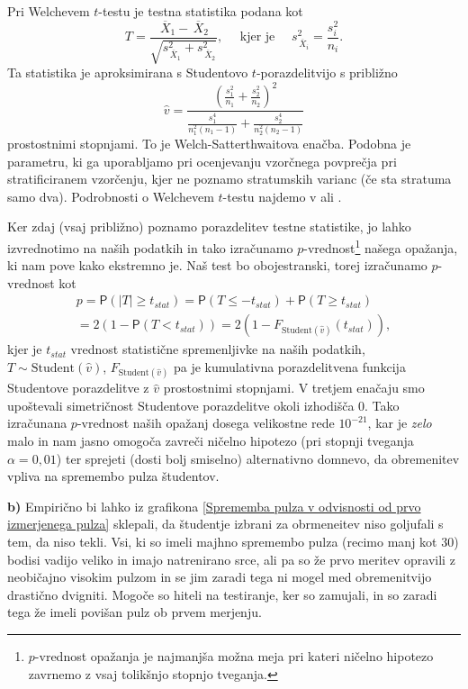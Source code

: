 \documentclass[a4paper,11pt]{article}
\newcommand{\olsi}[1]{\,\overline{\!{#1}}} %
\newcommand{\prob}{\mathsf{P}}
\begin{document}
Pri Welchevem $t$-testu je testna statistika podana kot
\[
    T = \frac{\olsi{X}_1 - \olsi{X}_2}{\sqrt{s_{\olsi{X}_1}^2 + s_{\olsi{X}_2}^2}},
    \quad \text{ kjer je }\quad s^2_{\olsi{X}_i} = \frac{s^2_i}{n_i}.
\]
Ta statistika je aproksimirana s Studentovo $t$-porazdelitvijo s približno 
\[
\hat{v} = \frac{\left(\frac{s_1^2}{n_1} + \frac{s_2^2}{n_2}\right)^2}{\frac{s_1^4}{n_1^2(n_1 - 1)} + \frac{s_2^4}{n_2^2(n_2 - 1)}} 
\]
prostostnimi stopnjami. To je Welch-Satterthwaitova enačba. Podobna je parametru, ki ga uporabljamo pri ocenjevanju vzorčnega povprečja pri stratificiranem vzorčenju, kjer ne poznamo stratumskih varianc (če sta stratuma samo dva). Podrobnosti o Welchevem $t$-testu najdemo v \cite{Welch} ali \cite[\S11]{Rice}.

Ker zdaj (vsaj približno) poznamo porazdelitev testne statistike, jo lahko izvrednotimo na naših podatkih in tako izračunamo $p$-vrednost\footnote{$p$-vrednost opažanja je najmanjša možna meja pri kateri ničelno hipotezo zavrnemo z vsaj tolikšnjo stopnjo tveganja.} našega opažanja, ki nam pove kako ekstremno je. Naš test bo obojestranski, torej izračunamo $p$-vrednost kot
\begin{multline*}
    p = \prob(\lvert T \rvert \geq t_{stat}) = 
    \prob(T \leq -t_{stat}) + \prob(T \geq t_{stat}) \\ = 
    2(1 - \prob(T < t_{stat})) = 
    2(1 - F_{\text{Student}(\hat{v})}(t_{stat})), 
\end{multline*}
kjer je $t_{stat}$ vrednost statistične spremenljivke na naših podatkih, $T \sim \text{Student}(\hat{v})$, $F_{\text{Student}(\hat{v})}$ pa je kumulativna porazdelitvena funkcija Studentove porazdelitve z $\hat v$ prostostnimi stopnjami. V tretjem enačaju smo upoštevali simetričnost Studentove porazdelitve okoli izhodišča $0$. Tako izračunana $p$-vrednost naših opažanj dosega velikostne rede $10^{-21}$, kar je \emph{zelo} malo in nam jasno omogoča zavreči ničelno hipotezo (pri stopnji tveganja $\alpha = 0,01$) ter sprejeti (dosti bolj smiselno) alternativno domnevo, da obremenitev vpliva na spremembo pulza študentov. 
\newline

\noindent
\textbf{b)} Empirično bi lahko  iz grafikona \ref{Sprememba pulza v odvisnosti od prvo izmerjenega pulza} sklepali, da študentje izbrani za obrmeneitev niso goljufali s tem, da niso tekli. Vsi, ki so imeli majhno spremembo pulza (recimo manj kot 30) bodisi vadijo veliko in imajo natrenirano srce, ali pa so že prvo meritev opravili z neobičajno visokim pulzom in se jim zaradi tega ni mogel med obremenitvijo drastično dvigniti. Mogoče so hiteli na testiranje, ker so zamujali, in so zaradi tega že imeli povišan pulz ob prvem merjenju.
\end{document}

